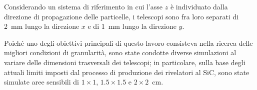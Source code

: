 Considerando un sistema di riferimento in cui l'asse $z$ è individuato dalla direzione di propagazione delle particelle, i telescopi sono fra loro separati di 2~mm lungo la direzione $x$ e di 1~mm lungo la direzione $y$.


%




Poiché uno degli obiettivi principali di questo lavoro consisteva nella ricerca delle migliori condizioni di granularità, sono state condotte diverse simulazioni al variare delle dimensioni trasversali dei telescopi; in particolare, sulla base degli attuali limiti imposti dal processo di produzione dei rivelatori al SiC, sono state simulate aree sensibili di $1 \times 1$, $1.5 \times 1.5$ e $2 \times 2$~cm.





